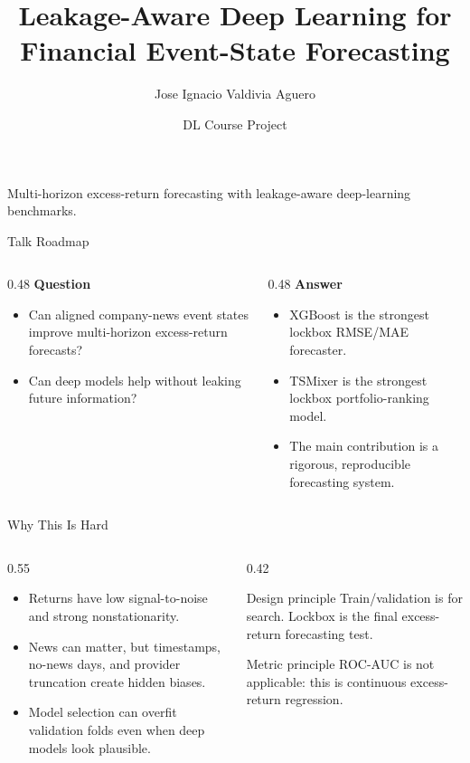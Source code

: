 \documentclass[aspectratio=169]{beamer}
\title[Event-State Forecasting]{Leakage-Aware Deep Learning for Financial Event-State Forecasting}
\author{Jose Ignacio Valdivia Aguero}
\institute{University of Luxembourg}
\date{DL Course Project}
\begin{document}
\begin{frame}
  \titlepage
  \vspace{-0.5em}
  \centering\small Multi-horizon excess-return forecasting with leakage-aware deep-learning benchmarks.
\end{frame}

\begin{frame}{Talk Roadmap}
\begin{columns}[T]
\begin{column}{0.48\textwidth}
\textbf{Question}
\begin{itemize}
  \item Can aligned company-news event states improve multi-horizon excess-return forecasts?
  \item Can deep models help without leaking future information?
\end{itemize}
\end{column}
\begin{column}{0.48\textwidth}
\textbf{Answer}
\begin{itemize}
  \item XGBoost is the strongest lockbox RMSE/MAE forecaster.
  \item TSMixer is the strongest lockbox portfolio-ranking model.
  \item The main contribution is a rigorous, reproducible forecasting system.
\end{itemize}
\end{column}
\end{columns}
\end{frame}

\begin{frame}{Why This Is Hard}
\begin{columns}[T]
\begin{column}{0.55\textwidth}
\begin{itemize}
  \item Returns have low signal-to-noise and strong nonstationarity.
  \item News can matter, but timestamps, no-news days, and provider truncation create hidden biases.
  \item Model selection can overfit validation folds even when deep models look plausible.
\end{itemize}
\end{column}
\begin{column}{0.42\textwidth}
\begin{block}{Design principle}
Train/validation is for search. Lockbox is the final excess-return forecasting test.
\end{block}
\begin{block}{Metric principle}
ROC-AUC is not applicable: this is continuous excess-return regression.
\end{block}
\end{column}
\end{columns}
\end{frame}
\end{document}
